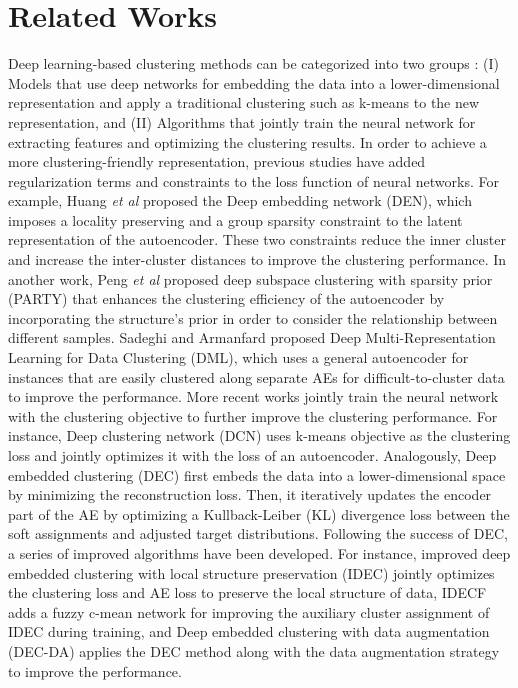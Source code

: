 \documentclass{bmvc2k}
\def\etal{\emph{et al}\bmvaOneDot}
\begin{document}
\section{Related Works}
\vspace{-2 mm}
\setlength{\parskip}{0pt}
Deep learning-based clustering methods can be categorized into two groups \cite{reviewCluster}: (I) Models that use deep networks for embedding the data into a lower-dimensional representation and apply a traditional clustering such as k-means to the new representation, and (II) Algorithms that jointly train the neural network for extracting features and optimizing the clustering results. In order to achieve a more clustering-friendly representation, previous studies have added regularization terms and constraints to the loss function of neural networks. For example, Huang \etal \cite{DEN} proposed the Deep embedding network (DEN), which imposes a locality preserving and a group sparsity constraint to the latent representation of the autoencoder. These two constraints reduce the inner cluster and increase the inter-cluster distances to improve the clustering performance. In another work, Peng \etal \cite{PARTY} proposed deep subspace clustering with sparsity prior (PARTY) that enhances the clustering efficiency of the autoencoder by incorporating the structure's prior in order to consider the relationship between different samples. Sadeghi and Armanfard \cite{DML} proposed Deep Multi-Representation Learning for Data Clustering (DML), which uses a general autoencoder for instances that are easily clustered along separate AEs for difficult-to-cluster data to improve the performance.
More recent works jointly train the neural network with the clustering objective to further improve the clustering performance. For instance, Deep clustering network (DCN) \cite{DCN} uses k-means objective as the clustering loss and jointly optimizes it with the loss of an autoencoder. Analogously, Deep embedded clustering (DEC) \cite{DEC} first embeds the data into a lower-dimensional space by minimizing the reconstruction loss. Then, it iteratively updates the encoder part of the AE by optimizing a Kullback-Leiber (KL) divergence \cite{KL} loss between the soft assignments and adjusted target distributions. Following the success of DEC, a series of improved algorithms have been developed. For instance, improved deep embedded clustering with local structure preservation (IDEC) \cite{IDEC} jointly optimizes the clustering loss and AE loss to preserve the local structure of data, IDECF \cite{IDECF} adds a fuzzy c-mean network for improving the auxiliary cluster assignment of IDEC during training, and Deep embedded clustering with data augmentation (DEC-DA) \cite{DECDA} applies the DEC method along with the data augmentation strategy to improve the performance. 
\end{document}
